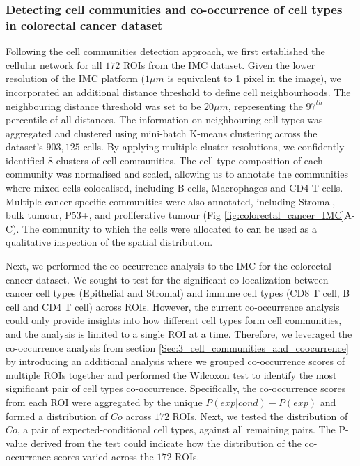 \subsubsection{Detecting cell communities and co-occurrence of cell types in colorectal cancer dataset}
Following the cell communities detection approach, we first established the cellular network for all $172$ ROIs from the IMC dataset. Given the lower resolution of the IMC platform ($1\mu m$ is equivalent to 1 pixel in the image), we incorporated an additional distance threshold to define cell neighbourhoods. The neighbouring distance threshold was set to be  $20\mu m$, representing the $97^{th}$ percentile of all distances. The information on neighbouring cell types was aggregated and clustered using mini-batch K-means clustering across the dataset's $903,125$ cells. By applying multiple cluster resolutions, we confidently identified 8 clusters of cell communities. The cell type composition of each community was normalised and scaled, allowing us to annotate the communities where mixed cells colocalised, including B cells, Macrophages and CD4 T cells. Multiple cancer-specific communities were also annotated, including Stromal, bulk tumour, P53+, and proliferative tumour (Fig \ref{fig:colorectal_cancer_IMC}A-C). The community to which the cells were allocated to can be used as a qualitative inspection of the spatial distribution.  

Next, we performed the co-occurrence analysis to the IMC for the colorectal cancer dataset.  We sought to test for the significant co-localization between cancer cell types (\ie Epithelial and Stromal) and immune cell types (\ie CD8 T cell, B cell and CD4 T cell) across ROIs. However, the current co-occurrence analysis could only provide insights into how different cell types form cell communities, and the analysis is limited to a single ROI at a time. Therefore, we leveraged the co-occurrence analysis from section \ref{Sec:3_cell_communities_and_coocurrence} by introducing an additional analysis where we grouped co-occurrence scores of multiple ROIs together and performed the Wilcoxon test to identify the most significant pair of cell types co-occurrence. Specifically, the co-occurrence scores from each ROI were aggregated by the unique $P(exp|cond)-P(exp)$ and formed a distribution of $Co$ across $172$ ROIs. Next, we tested the distribution of $Co$, a pair of expected-conditional cell types, against all remaining pairs. The P-value derived from the test could indicate how the distribution of the co-occurrence scores varied across the $172$ ROIs.
